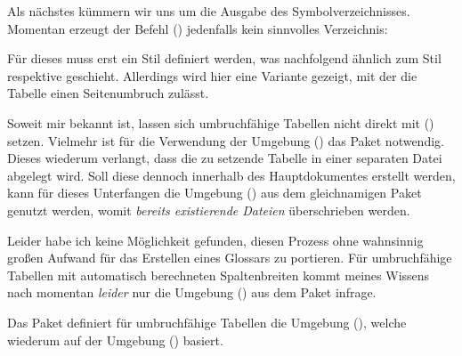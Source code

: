 \documentclass[%
  english,ngerman,%
  cdgeometry=no,DIV=12,%
  automark,%
  listof=toc,%
]{tudscrartcl}
\begin{document}
%
Als nächstes kümmern wir uns um die Ausgabe des Symbolverzeichnisses. Momentan 
erzeugt der Befehl () jedenfalls kein 
sinnvolles Verzeichnis:
%
\begin{Hint}
\printsymbols
\end{Hint}
\begin{quoting}[rightmargin=0pt]
\glsdisablehyper
\printsymbols[style=simple]
\end{quoting}
%
Für dieses muss erst ein Stil definiert werden, was nachfolgend ähnlich zum 
Stil  respektive  geschieht. Allerdings 
wird hier eine Variante gezeigt, mit der die Tabelle einen Seitenumbruch 
zulässt.

Soweit mir bekannt ist, lassen sich umbruchfähige Tabellen nicht direkt mit 
() setzen. Vielmehr ist für die 
Verwendung der Umgebung () das Paket 
 notwendig. Dieses wiederum verlangt, dass die zu setzende 
Tabelle in einer separaten Datei abgelegt wird. Soll diese dennoch innerhalb 
des Hauptdokumentes erstellt werden, kann für dieses Unterfangen die Umgebung 
() aus dem gleichnamigen Paket 
genutzt werden, womit \emph{bereits existierende Dateien} überschrieben werden.

Leider habe ich keine Möglichkeit gefunden, diesen Prozess ohne wahnsinnig 
großen Aufwand für das Erstellen eines Glossars zu portieren. Für umbruchfähige 
Tabellen mit automatisch berechneten Spaltenbreiten kommt meines Wissens nach 
momentan \emph{leider} nur die Umgebung () 
aus dem Paket  infrage.

Das Paket  definiert für umbruchfähige Tabellen die Umgebung 
(), welche wiederum auf der Umgebung 
() basiert.
\end{document}
